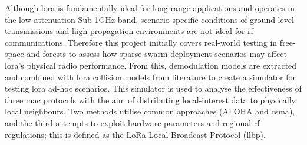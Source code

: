 Although \ac{lora} is fundamentally ideal for long-range applications and operates in the low attenuation Sub-1GHz band, scenario specific conditions of ground-level transmissions and high-propagation environments are not ideal for \ac{rf} communications. Therefore this project initially covers real-world testing in free-space and forests to assess how sparse swarm deployment scenarios may affect \ac{lora}'s physical radio performance. From this, demodulation models are extracted and combined with \ac{lora} collision models from literature to create a simulator for testing \ac{lora} ad-hoc scenarios. This simulator is used to analyse the effectiveness of three \ac{mac} protocols with the aim of distributing local-interest data to physically local neighbours. Two methods utilise common approaches (ALOHA and \ac{csma}), and the third attempts to exploit hardware parameters and regional \ac{rf} regulations; this is defined as the LoRa Local Broadcast Protocol (\ac{llbp}).




